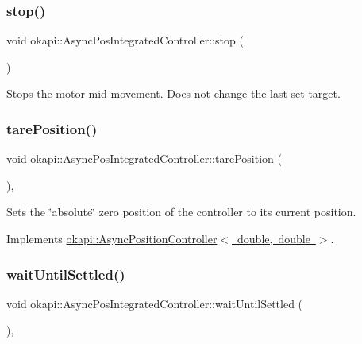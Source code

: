 \subsubsection{\texorpdfstring{stop()}{stop()}}
{\footnotesize\ttfamily void okapi\+::\+Async\+Pos\+Integrated\+Controller\+::stop (\begin{DoxyParamCaption}{ }\end{DoxyParamCaption})\hspace{0.3cm}{\ttfamily [virtual]}}

Stops the motor mid-\/movement. Does not change the last set target. \mbox{\label{classokapi_1_1AsyncPosIntegratedController_a5fa801adbb46287423c5baae82f75924}} 
\subsubsection{\texorpdfstring{tarePosition()}{tarePosition()}}
{\footnotesize\ttfamily void okapi\+::\+Async\+Pos\+Integrated\+Controller\+::tare\+Position (\begin{DoxyParamCaption}{ }\end{DoxyParamCaption})\hspace{0.3cm}{\ttfamily [override]}, {\ttfamily [virtual]}}

Sets the \char`\"{}absolute\char`\"{} zero position of the controller to its current position. 

Implements \mbox{\hyperlink{classokapi_1_1AsyncPositionController_a0af03d0035343cbf843a19374f38a059}{okapi\+::\+Async\+Position\+Controller$<$ double, double $>$}}.

\mbox{\label{classokapi_1_1AsyncPosIntegratedController_a9f03807433a02bcbee583c1d85eaf55a}} 
\subsubsection{\texorpdfstring{waitUntilSettled()}{waitUntilSettled()}}
{\footnotesize\ttfamily void okapi\+::\+Async\+Pos\+Integrated\+Controller\+::wait\+Until\+Settled (\begin{DoxyParamCaption}{ }\end{DoxyParamCaption})\hspace{0.3cm}{\ttfamily [override]}, {\ttfamily [virtual]}}

